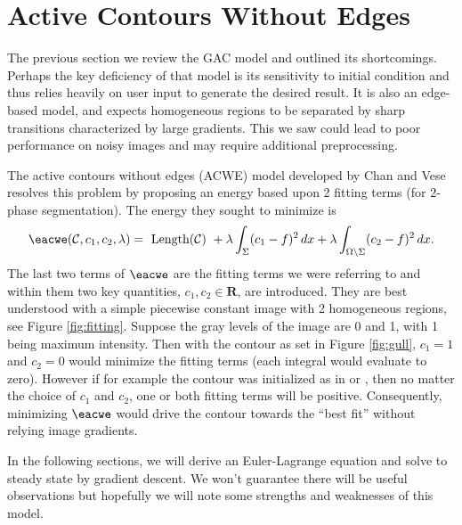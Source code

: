 \chapter{Active Contours Without Edges}
The previous section we review the GAC model and outlined its shortcomings. Perhaps the key deficiency of that model is its sensitivity to initial condition and thus relies heavily on user input to generate the desired result. It is also an edge-based model, and expects homogeneous regions to be separated by sharp transitions characterized by large gradients. This we saw could lead to poor performance on noisy images and may require additional preprocessing.

The active contours without edges (ACWE) model developed by Chan and Vese \cite{chan2001active} resolves this problem by proposing an energy based upon 2 fitting terms (for 2-phase segmentation). The energy they sought to minimize is 
\begin{align}
\eacwe(\C, c_1, c_2, \lambda)
= \textrm{ Length($\C$) } 
+ \lambda \int_{\Sigma} (c_1 - f )^2 \,dx
+ \lambda \int_{\Omega \setminus \Sigma} (c_2 - f )^2 \,dx.
\end{align}
The last two terms of $\eacwe$ are the fitting terms we were referring to and within them two key quantities, $c_1, c_2 \in \mathbf{R}$, are introduced. They are best understood with a simple piecewise constant image with 2 homogeneous regions, see Figure \ref{fig:fitting}. Suppose the gray levels of the image are 0 and 1, with 1 being maximum intensity. Then with the contour as set in Figure \ref{fig:gull}, $c_1 = 1$ and $c_2 = 0$ would minimize the fitting terms (each integral would evaluate to zero). However if for example the contour was initialized as in  or , then no matter the choice of $c_1$ and $c_2$, one or both fitting terms will be positive. Consequently, minimizing $\eacwe$ would drive the contour towards the ``best fit'' without relying image gradients.

In the following sections, we will derive an Euler-Lagrange equation and solve to steady state by gradient descent. We won't guarantee there will be useful observations but hopefully we will note some strengths and weaknesses of this model.

